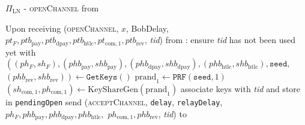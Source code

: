 \begin{protocolbox}{$\Pi_{\mathrm{LN}}$ - \textsc{openChannel} from \bob}
  \label{alg:protocol:open:openChannel}
  \begin{algorithmic}[1]
    \State Upon receiving (\textsc{openChannel}, $x$, BobDelay, $pt_F,
    ptb_{\mathrm{pay}}, ptb_{\mathrm{dpay}}, ptb_{\mathrm{htlc}},
    pt_{\mathrm{com}, 1}, ptb_{\mathrm{rev}}$, \textit{tid}) from \bob:
    \Indent
      \State ensure \textit{tid} has not been used yet with \bob
      \State $\left(\left(ph_F, sh_F\right), \left(phb_{\mathrm{pay}},
      shb_{\mathrm{pay}}\right), \left(phb_{\mathrm{dpay}},
      shb_{\mathrm{dpay}}\right), \left(phb_{\mathrm{htlc}},
      shb_{\mathrm{htlc}}\right), \mathtt{seed},\right.$
      $\left.\left(phb_{\mathrm{rev}}, shb_{\mathrm{rev}}\right)\right) \gets
      \texttt{GetKeys}\left(\right)$
      \State $\mathrm{prand}_1 \gets \texttt{PRF}\left(\mathtt{seed}, 1\right)$
      \State $\left(sh_{\mathrm{com}, 1}, ph_{\mathrm{com}, 1}\right) \gets
      \mathrm{KeyShareGen}\left(\mathrm{prand}_1\right)$
      \State associate keys with \textit{tid} and store in \texttt{pendingOpen}
      \State send (\textsc{acceptChannel}, \texttt{delay}, \texttt{relayDelay},
      $ph_F, phb_{\mathrm{pay}}, phb_{\mathrm{dpay}}, phb_{\mathrm{htlc}},$
      $ph_{\mathrm{com}, 1}, phb_{\mathrm{rev}}$, \textit{tid}) to \bob{}
    \EndIndent
  \end{algorithmic}
\end{protocolbox}

